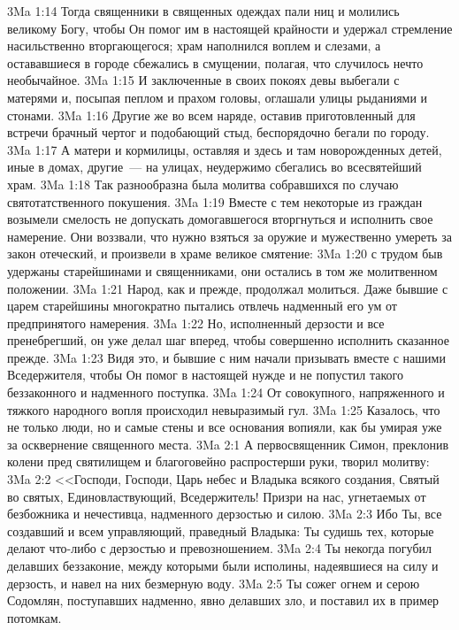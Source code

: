\vs 3Ma 1:14 Тогда священники в священных одеждах пали ниц и молились великому Богу, чтобы Он помог им в настоящей крайности и удержал стремление насильственно вторгающегося; храм наполнился воплем и слезами, а остававшиеся в городе сбежались в смущении, полагая, что случилось нечто необычайное.
\vs 3Ma 1:15 И заключенные в своих покоях девы выбегали с матерями и, посыпая пеплом и прахом головы, оглашали улицы рыданиями и стонами.
\vs 3Ma 1:16 Другие же во всем наряде, оставив приготовленный для встречи брачный чертог и подобающий стыд, беспорядочно бегали по городу.
\vs 3Ma 1:17 А матери и кормилицы, оставляя и здесь и там новорожденных детей, иные в домах, другие~--- на улицах, неудержимо сбегались во всесвятейший храм.
\vs 3Ma 1:18 Так разнообразна была молитва собравшихся по случаю святотатственного покушения.
\vs 3Ma 1:19 Вместе с тем некоторые из граждан возымели смелость не допускать домогавшегося вторгнуться и исполнить свое намерение. Они воззвали, что нужно взяться за оружие и мужественно умереть за закон отеческий, и произвели в храме великое смятение:
\vs 3Ma 1:20 с трудом быв удержаны старейшинами и священниками, они остались в том же молитвенном положении.
\vs 3Ma 1:21 Народ, как и прежде, продолжал молиться. Даже бывшие с царем старейшины многократно пытались отвлечь надменный его ум от предпринятого намерения.
\vs 3Ma 1:22 Но, исполненный дерзости и все пренебрегший, он уже делал шаг вперед, чтобы совершенно исполнить сказанное прежде.
\vs 3Ma 1:23 Видя это, и бывшие с ним начали призывать вместе с нашими Вседержителя, чтобы Он помог в настоящей нужде и не попустил такого беззаконного и надменного поступка.
\vs 3Ma 1:24 От совокупного, напряженного и тяжкого народного вопля происходил невыразимый гул.
\vs 3Ma 1:25 Казалось, что не только люди, но и самые стены и все основания вопияли, как бы умирая уже за осквернение священного места.
\vs 3Ma 2:1 А первосвященник Симон, преклонив колени пред святилищем и благоговейно распростерши руки, творил молитву:
\vs 3Ma 2:2 <<Господи, Господи, Царь небес и Владыка всякого создания, Святый во святых, Единовластвующий, Вседержитель! Призри на нас, угнетаемых от безбожника и нечестивца, надменного дерзостью и силою.
\vs 3Ma 2:3 Ибо Ты, все создавший и всем управляющий, праведный Владыка: Ты судишь тех, которые делают что-либо с дерзостью и превозношением.
\vs 3Ma 2:4 Ты некогда погубил делавших беззаконие, между которыми были исполины, надеявшиеся на силу и дерзость, и навел на них безмерную воду.
\vs 3Ma 2:5 Ты сожег огнем и серою Содомлян, поступавших надменно, явно делавших зло, и поставил их в пример потомкам.
